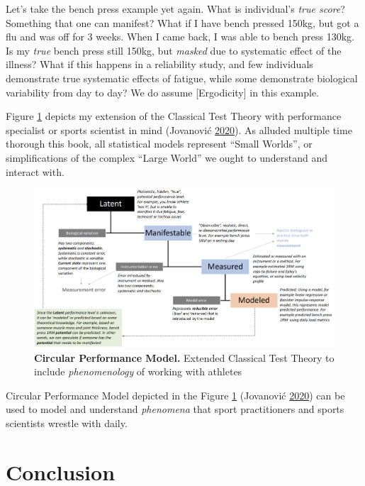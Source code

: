 \documentclass[
]{book}
\begin{document}
Let's take the bench press example yet again. What is individual's \emph{true score}? Something that one can manifest? What if I have bench pressed 150kg, but got a flu and was off for 3 weeks. When I came back, I was able to bench press 130kg. Is my \emph{true} bench press still 150kg, but \emph{masked} due to systematic effect of the illness? What if this happens in a reliability study, and few individuals demonstrate true systematic effects of fatigue, while some demonstrate biological variability from day to day? We do assume {[}Ergodicity{]} in this example.

Figure \ref{fig:circular-performance-model} depicts my extension of the Classical Test Theory with performance specialist or sports scientist in mind (Jovanović \protect\hyperlink{ref-jovanovicExtendingClassicalTest2020}{2020}). As alluded multiple time thorough this book, all statistical models represent ``Small Worlds'', or simplifications of the complex ``Large World'' we ought to understand and interact with.

\begin{figure}

{\centering \includegraphics[width=0.9\linewidth]{figures/circular-performance-model} 

}

\caption{\textbf{Circular Performance Model.} Extended Classical Test Theory to include \emph{phenomenology} of working with athletes}\label{fig:circular-performance-model}
\end{figure}



Circular Performance Model depicted in the Figure \ref{fig:circular-performance-model} (Jovanović \protect\hyperlink{ref-jovanovicExtendingClassicalTest2020}{2020}) can be used to model and understand \emph{phenomena} that sport practitioners and sports scientists wrestle with daily.

\hypertarget{conclusion}{%
\chapter{Conclusion}\label{conclusion}}
\end{document}
